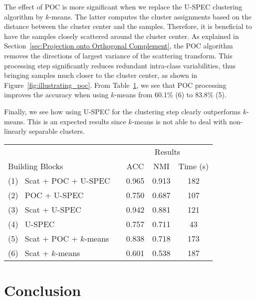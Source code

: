 \documentclass[11pt]{article}
\theoremstyle{definition}
\newcommand{\Table}[1]{Table~\ref{#1}}
\newcommand{\Figure}[1]{Figure~\ref{#1}}
\newcommand{\Section}[1]{Section~\ref{#1}}
\begin{document}
The effect of POC is more significant when we replace the U-SPEC clustering algorithm by $k$-means. The latter computes the cluster assignments based on the distance between the cluster center and the samples. Therefore, it is beneficial to have the samples closely scattered around the cluster center. As explained in \Section{sec:Projection onto Orthogonal Complement}, the POC algorithm removes the directions of largest variance of the scattering transform. This processing step significantly reduces redundant intra-class variabilities, thus bringing samples much closer to the cluster center, as shown in \Figure{fig:illustrating_poc}. From \Table{table:ablation study}, we see that POC processing improves the accuracy when using $k$-means from 60.1\% (6) to 83.8\% (5).

Finally, we see how using U-SPEC for the clustering step clearly outperforms $k$-means. This is an expected results since $k$-means is not able to deal with non-linearly separable clusters.

\begin{table}[tb]
	\centering
	\label{table:ablation study}
\begin{tabular}{|lr|ccc|}
		\hline
		&&  \multicolumn{3}{c|}{Results}\\
		Building Blocks && ACC & NMI & Time (s)\\
		\hline
(1) ~Scat + POC + U-SPEC && 0.965 & 0.913 & 182 \\
(2) ~POC + U-SPEC && 0.750 & 0.687 & 107 \\
(3) ~Scat + U-SPEC && 0.942 & 0.881 & 121 \\
(4) ~U-SPEC && 0.757 & 0.711 & 43 \\
(5) ~Scat + POC + $k$-means && 0.838 & 0.718 & 173 \\
(6) ~Scat + $k$-means && 0.601 & 0.538 & 187 \\
		
		


		\hline
		
	\end{tabular}
\end{table}


\section{Conclusion}\label{sec:conclusion}
\end{document}
